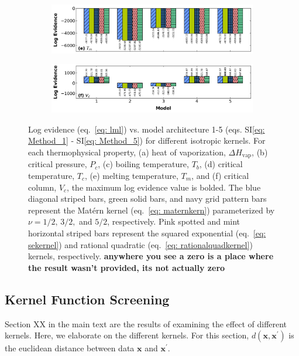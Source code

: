 \documentclass[journal=jacsat,manuscript=article]{achemso}
\newcommand{\siref}[1]{SI\eqref{#1}}
\begin{document}
\begin{figure}
\begin{subfigure}[b]{0.75\textwidth}
         \includegraphics[width=\textwidth]{images/lml_bar_chart_Tm_True.png}
     \end{subfigure}
     \hfill
     \begin{subfigure}[b]{0.75\textwidth}
         \centering
         \includegraphics[width=\textwidth]{images/lml_bar_chart_Vc_True.png}
     \end{subfigure}
     \caption{Log evidence (eq.~\eqref{eq: lml}) vs. model architecture 1-5 (eqs. \siref{eq: Method_1} - \siref{eq: Method_5}) for different isotropic kernels. For each thermophysical property, (a) heat of vaporization, $\Delta H_{\text{vap}}$, (b) critical pressure, $P_c$, (c) boiling temperature, $T_b$, (d) critical temperature, $T_c$, (e) melting temperature, $T_m$, and (f) critical column, $V_c$, the maximum log evidence value is bolded. The blue diagonal striped bars, green solid bars, and navy grid pattern bars represent the Mat\'ern kernel (eq.~\eqref{eq: maternkern}) parameterized by $\nu = 1/2, \, 3/2,$ and $5/2$, respectively. Pink spotted and mint horizontal striped bars represent the squared exponential (eq.~\eqref{eq: sekernel}) and rational quadratic (eq.~\eqref{eq: rationalquadkernel}) kernels, respectively. \textbf{anywhere you see a zero is a place where the result wasn't provided, its not actually zero}}
     \label{fig: lmlbarchartaniso}
\end{figure}

\subsection{Kernel Function Screening}

Section XX in the main text are the results of examining the effect of different kernels. Here, we elaborate on the different kernels. For this section, $d(\mathbf{x}, \mathbf{x}^{\prime})$ is the euclidean distance between data $\mathbf{x}$ and $\mathbf{x}^{\prime}$.
\end{document}
